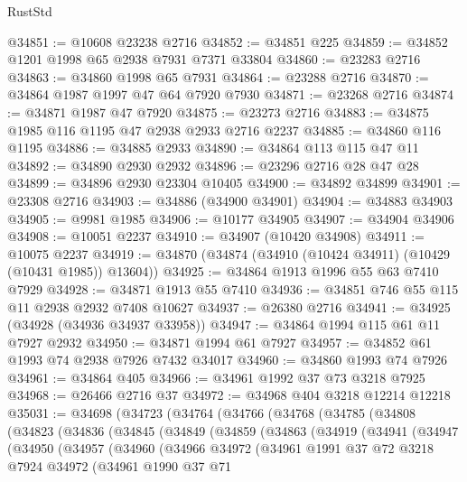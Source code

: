 \begin{lexlean}{RustStd}
\begin{coremodule}
@34851 := @10608 @23238 @2716
@34852 := @34851 @225
@34859 := @34852 @1201 @1998 @65 @2938 @7931 @7371 @33804
@34860 := @23283 @2716
@34863 := @34860 @1998 @65 @7931
@34864 := @23288 @2716
@34870 := @34864 @1987 @1997 @47 @64 @7920 @7930
@34871 := @23268 @2716
@34874 := @34871 @1987 @47 @7920
@34875 := @23273 @2716
@34883 := @34875 @1985 @116 @1195 @47 @2938 @2933 @2716 @2237
@34885 := @34860 @116 @1195
@34886 := @34885 @2933
@34890 := @34864 @113 @115 @47 @11
@34892 := @34890 @2930 @2932
@34896 := @23296 @2716 @28 @47 @28
@34899 := @34896 @2930 @23304 @10405
@34900 := @34892 @34899
@34901 := @23308 @2716
@34903 := @34886 (@34900 @34901)
@34904 := @34883 @34903
@34905 := @9981 @1985
@34906 := @10177 @34905
@34907 := @34904 @34906
@34908 := @10051 @2237
@34910 := @34907 (@10420 @34908)
@34911 := @10075 @2237
@34919 := @34870 (@34874 (@34910 (@10424 @34911) (@10429 (@10431 @1985)) @13604))
@34925 := @34864 @1913 @1996 @55 @63 @7410 @7929
@34928 := @34871 @1913 @55 @7410
@34936 := @34851 @746 @55 @115 @11 @2938 @2932 @7408 @10627
@34937 := @26380 @2716
@34941 := @34925 (@34928 (@34936 @34937 @33958))
@34947 := @34864 @1994 @115 @61 @11 @7927 @2932
@34950 := @34871 @1994 @61 @7927
@34957 := @34852 @61 @1993 @74 @2938 @7926 @7432 @34017
@34960 := @34860 @1993 @74 @7926
@34961 := @34864 @405
@34966 := @34961 @1992 @37 @73 @3218 @7925
@34968 := @26466 @2716 @37
@34972 := @34968 @404 @3218 @12214 @12218
@35031 := @34698
    (@34723
      (@34764
        (@34766
          (@34768
            (@34785
              (@34808
                (@34823
                  (@34836
                    (@34845
                      (@34849
                        (@34859
                          (@34863
                            (@34919
                              (@34941
                                (@34947
                                  (@34950
                                    (@34957
                                      (@34960
                                        (@34966
                                          @34972
                                          (@34961
                                            @1991
                                            @37
                                            @72
                                            @3218
                                            @7924
                                            @34972
                                            (@34961
                                              @1990
                                              @37
                                              @71

\end{coremodule}
\end{lexlean}
